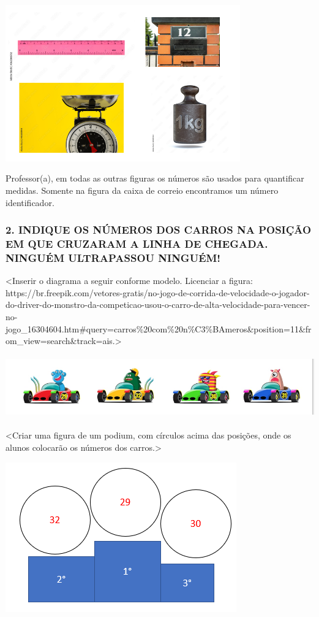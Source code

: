 \includegraphics[width=3.98893in,height=2.65350in]{media/image2.png}

Professor(a), em todas as outras figuras os números são usados para
quantificar medidas. Somente na figura da caixa de correio encontramos
um número identificador.

\subsubsection{2. INDIQUE OS NÚMEROS DOS CARROS NA POSIÇÃO EM QUE
CRUZARAM A LINHA DE CHEGADA. NINGUÉM ULTRAPASSOU NINGUÉM!
}\label{indique-os-nuxfameros-dos-carros-na-posiuxe7uxe3o-em-que-cruzaram-a-linha-de-chegada.-ninguuxe9m-ultrapassou-ninguuxe9m}

\textless{}Inserir o diagrama a seguir conforme modelo. Licenciar a
figura:
https://br.freepik.com/vetores-gratis/no-jogo-de-corrida-de-velocidade-o-jogador-do-driver-do-monstro-da-competicao-usou-o-carro-de-alta-velocidade-para-vencer-no-jogo\_16304604.htm\#query=carros\%20com\%20n\%C3\%BAmeros\&position=11\&from\_view=search\&track=ais.\textgreater{}

\includegraphics[width=5.90556in,height=1.06250in]{media/image3.png}

\textless{}Criar uma figura de um podium, com círculos acima das
posições, onde os alunos colocarão os números dos carros.\textgreater{}

\includegraphics[width=3.92763in,height=2.54202in]{media/image4.png}

